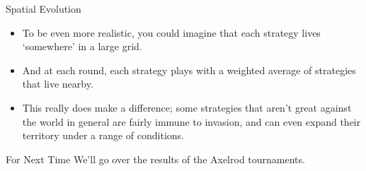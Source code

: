 \documentclass[
  ignorenonframetext,
]{beamer}
\providecommand{\tightlist}{%
  \setlength{\itemsep}{0pt}\setlength{\parskip}{0pt}}
\begin{document}
\begin{frame}{Spatial Evolution}
\protect\hypertarget{spatial-evolution}{}
\begin{itemize}
\tightlist
\item
  To be even more realistic, you could imagine that each strategy lives
  `somewhere' in a large grid.
\item
  And at each round, each strategy plays with a weighted average of
  strategies that live nearby.
\item
  This really does make a difference; some strategies that aren't great
  against the world in general are fairly immune to invasion, and can
  even expand their territory under a range of conditions.
\end{itemize}
\end{frame}

\begin{frame}{For Next Time}
\protect\hypertarget{for-next-time}{}
We'll go over the results of the Axelrod tournaments.
\end{frame}
\end{document}
